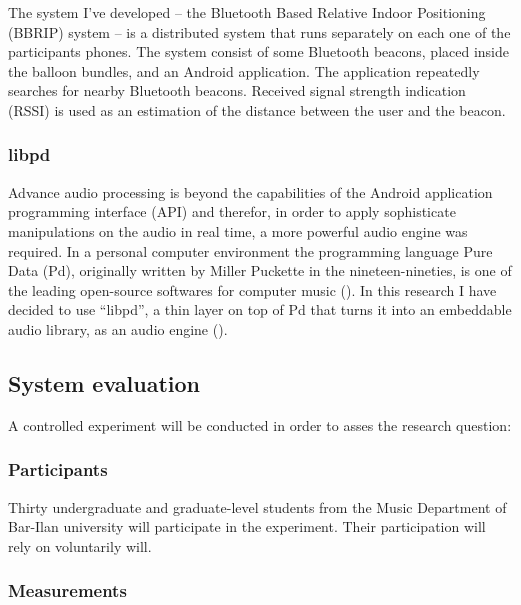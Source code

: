 
The system I've developed -- the Bluetooth Based Relative Indoor Positioning (BBRIP) system -- is a distributed system that runs separately on each one of the participants phones.
The system consist of some Bluetooth beacons, placed inside the balloon bundles, and an Android application.
The application repeatedly searches for nearby Bluetooth beacons.
Received signal strength indication (RSSI) is used as an estimation of the distance between the user and the beacon.

\subsubsection{libpd}\label{methods:libpd}

Advance audio processing is beyond the capabilities of the Android application programming interface (API) and therefor, in order to apply sophisticate manipulations on the audio in real time, a more powerful audio engine was required.
In a personal computer environment the programming language Pure Data (Pd), originally written by Miller Puckette in the nineteen-nineties, is one of the leading open-source softwares for computer music (\cite{web:pd}).
In this research I have decided to use ``libpd'', a thin layer on top of Pd that turns it into an embeddable audio library, as an audio engine (\cite[page v]{brinkmann12}).

\subsection{System evaluation}\label{methods:evaluation}

A controlled experiment will be conducted in order to asses the research question: \emph{\reserchquestion}

\subsubsection{Participants}

Thirty undergraduate and graduate-level students from the Music Department of Bar-Ilan university will participate in the experiment.
Their participation will rely on voluntarily will.

\subsubsection{Measurements}

